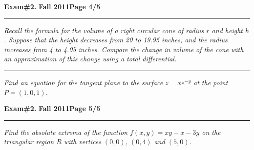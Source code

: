 \documentclass[12pt]{article}
\begin{document}
\hfill{\large\bf Exam\#2.}\hfill{\large\bf
  Fall 2011}\hfill{\large\bf Page 4/5}\hrule

\bigskip
{\problem[15 pts] \em Recall the formula for the volume of a right circular cone of radius $r$ and height $h$.  Suppose that the height decreases from 20 to 19.95 inches, and the radius increases from 4 to 4.05 inches.  Compare the change in volume of the cone with an approximation of this change using a total differential.}
\vspace{9cm}
\begin{flushright}
\end{flushright}
\hrule
{\problem[10 pts] \em Find an equation for the tangent plane to the surface $z=xe^{-y}$ at the point $P=(1,0,1)$.}
\vspace{4cm}
\begin{flushright}
\end{flushright}
\newpage

\hfill{\large\bf Exam\#2.}\hfill{\large\bf
  Fall 2011}\hfill{\large\bf Page 5/5}\hrule

\bigskip
{\problem[20 pts] \em Find the absolute extrema of the function $f(x,y) = xy-x-3y$ on the triangular region $R$ with vertices $(0,0)$, $(0,4)$ and $(5,0)$.}
\vspace{18.5cm}
\begin{flushright}
\end{flushright}
\end{document}
